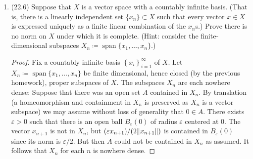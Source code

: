 \documentclass[11pt]{article}
\newcommand{\cbr}[1]{\left\{#1\right\}}
\DeclareMathOperator{\Span}{span}
\DeclareMathOperator{\im}{im}
\begin{document}
\begin{enumerate}
\begin{enumerate}
\begin{proof}
          We prove a small lemma first. For nonzero $x\in X$, $\norm{Tx}\geq \norm{(T^\ast)^{-1}}^{-1}\norm{x}$. To obtain this, choose $g\in X^\ast$ detecting the norm of $x$: $\norm{g} = 1$, $gx = \norm{x}>0$. Then $0<\norm{x} = gx = (T^\ast (T^\ast)^{-1}g)x = ((T^\ast)^{-1}g)(Tx) = \abs{((T^\ast)^{-1}g)(Tx)}\leq \norm{(T^\ast)^{-1}g}\norm{Tx}\leq \norm{(T^\ast)^{-1}}\norm{g}\norm{Tx} = \norm{(T^\ast)^{-1}}\norm{Tx}$.

          Then if $\overline{\im T} = Y$, for $y\in Y$ there is a sequence $(y_n = Tx_n)$ converging to $y$; in particular this sequence is a Cauchy sequence. Then for $\varepsilon>0$ given there is $N$ large enough so that $\norm{Tx_n - Tx_{n+1}} =\norm{T(x_n-x_{n+1})}<\varepsilon$ for $n\geq N$. But $\norm{T(x_n-x_{n+1})}\geq \norm{(T^\ast)^{-1}}^{-1}\norm{x_n-x_{n+1}}$, from which it follows that $(x_n)$ is a Cauchy sequence. When $X$ is complete this sequence converges to some $x\in X$ and it follows that $y = Tx$; hence $T$ is surjective and thus invertible as needed.
        \end{proof}
    \end{enumerate}
    \item (22.6) Suppose that $X$ is a vector space with a countably infinite basis. (That is, there is a linearly independent set $\{x_n\} \subset X$ such that every vector $x \in X$ is expressed uniquely as a finite linear combination of the $x_n$s.) Prove there is no norm on $X$ under which it is complete. (Hint: consider the finite-dimensional subspaces $X_n \coloneqq \Span\{x_1,\dots ,x_n\}$.) \begin{proof}
      Fix a countably infinite basis $\cbr{x_i}_{i=1}^\infty$ of $X$. Let $X_n\coloneqq \Span\{x_1,\dots,x_n\}$ be finite dimensional, hence closed (by the previous homework), proper subspaces of $X$. The subspaces $X_n$ are each nowhere dense: Suppose that there was an open set $A$ contained in $X_n$. By translation (a homeomorphism and containment in $X_n$ is preserved as $X_n$ is a vector subspace) we may assume without loss of generality that $0\in A$. There exists $\varepsilon>0$ such that there is an open ball $B_\varepsilon(0)$ of radius $\varepsilon$ centered at $0$. The vector $x_{n+1}$ is not in $X_n$, but $(\varepsilon x_{n+1})/(2\norm{x_{n+1}}) $ is contained in $B_\varepsilon(0)$ since its norm is $\varepsilon/2$. But then $A$ could not be contained in $X_n$ as assumed. It follows that $X_n$ for each $n$ is nowhere dense. 


\end{proof}
\end{enumerate}
\end{document}
